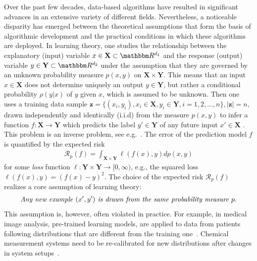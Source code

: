 \documentclass[USenglish]{article}
\newcommand{\bX}{\mathbf{X}}
\newcommand{\bY}{\mathbf{Y}}
\newcommand{\bz}{\mathbf{z}}
\def\R{\mathbbm R}
\begin{document}
Over the past few decades, data-based algorithms have resulted in significant advances in an extensive variety of different fields. Nevertheless, a noticeable disparity has emerged between the theoretical assumptions that form the basis of algorithmic development and the practical conditions in which these algorithms are deployed. In learning theory, one studies the relationship between the explanatory (input) variable $x \in \mathbf{X} \subset \R^{d_1}$ and the response (output) variable $y \in \mathbf{Y} \subset \R^{d_2}$ under the assumption that they are governed by an unknown probability measure $p(x,y)$ on $\bX \times \mathbf{Y}$. This means that an input $x \in \mathbf{X}$ does not determine uniquely an output  $y \in \mathbf{Y}$, but rather a conditional probability $\rho (y|x)$ of $y$ given $x$, which is assumed to be unknown. Then one uses a training data sample $\bz = \{(x_i,y_i), x_i \in \mathbf{X}, y_i \in \mathbf{Y}, i = 1,2,\ldots, n\}, |\bz| = n,$ drawn independently and identically (i.i.d) from the measure $p(x,y)$ to infer a function $f: \bX \to \mathbf{Y}$ which predicts the label $y' \in \mathbf{Y} $ of any future input $x' \in \bX$ \cite{Cucker2001OnTM,vapnik2013nature}. This problem is an inverse problem, see e.g.~\cite{de2005learning,smale2007,bauer2007}. The error of the prediction model $f$ is quantified by the expected risk 
\begin{align}\label{eq:generalization_error}
    \mathcal{R}_p(f)=\int_{\bX \times \bY} \ell (f(x),y) d p(x,y)
\end{align}
for some \textit{loss} function $\ell:\bY\times\bY\to[0,\infty)$, e.g., the squared loss $\ell(f(x),y)=(f(x)-y)^2$. The choice of the expected risk $\mathcal{R}_p (f)$ realizes a core assumption of learning theory:
\begin{align*}
    \text{\it{Any new example $(x',y')$ is drawn from the same probability measure $p$}}.
\end{align*}
This assumption is, however, often violated in practice.
For example, in medical image analysis, pre-trained learning models, are applied to data from patients following distributions that are different from the training one~\cite{meyer2021domain}.
Chemical measurement systems need to be re-calibrated for new distributions after changes in system setups~\cite{nikzad2018domain}.
\end{document}
